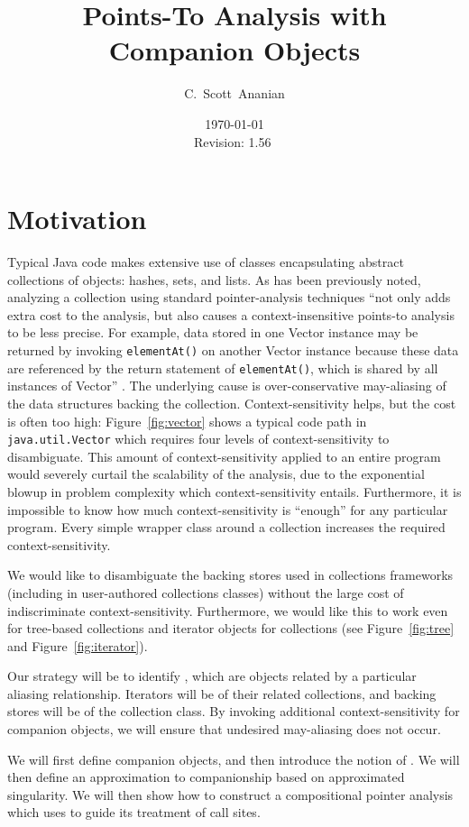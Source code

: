 \documentclass[11pt,notitlepage]{article}
\author{C.~Scott~Ananian}
\title{Points-To Analysis with Companion Objects}
\date{\today \\ $ $Revision: 1.56 $ $}
\begin{document}

\maketitle
\section{Motivation}
Typical Java code makes extensive use of classes encapsulating abstract
collections of objects: hashes, sets, and lists.  As has been
previously noted, analyzing a collection using standard pointer-analysis
techniques ``not only adds extra cost to the analysis, but also causes
a context-insensitive points-to analysis to be less precise.  For
example, data stored in one Vector instance may be returned by
invoking \texttt{elementAt()} on another Vector instance because these
data are referenced by the return statement of \texttt{elementAt()},
which is shared by all instances of Vector'' \cite[p. 75]{379676}.
The underlying cause is over-conservative may-aliasing of the data
structures backing the collection.  Context-sensitivity helps, but the
cost is often too high: Figure~\ref{fig:vector} shows a typical
code path in \texttt{java.util.Vector} which requires four levels of
context-sensitivity to disambiguate.  This amount of
context-sensitivity applied to an entire program would severely
curtail the scalability of the analysis, due to the exponential blowup
in problem complexity which context-sensitivity entails.  Furthermore,
it is impossible to know how much context-sensitivity is ``enough''
for any particular program.  Every simple wrapper class around a
collection increases the required context-sensitivity.

We would like to disambiguate the backing stores used in collections
frameworks (including in user-authored collections classes) without
the large cost of indiscriminate context-sensitivity.  Furthermore, we
would like this to work even for tree-based collections and iterator
objects for collections (see Figure~\ref{fig:tree} and
Figure~\ref{fig:iterator}).

Our strategy will be to identify , which
are objects related by a particular aliasing relationship.  Iterators
will be  of their related collections, and
backing stores will be  of the collection
class.  By invoking additional context-sensitivity for companion
objects, we will ensure that undesired may-aliasing does not occur.

We will first define companion objects, and then introduce the notion
of .  We will then define an approximation to
companionship based on approximated singularity.  We will then show
how to construct a compositional pointer analysis which uses
 to guide its treatment of call sites.
\end{document}
